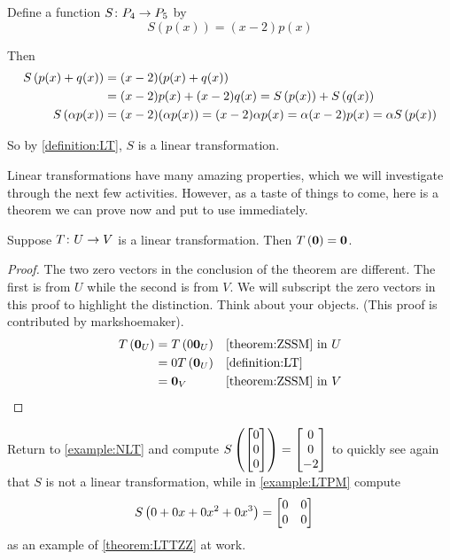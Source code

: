 \documentclass{ximera}
\begin{document}
\begin{example}

Define a function $S\colon P_4\rightarrow P_5$ by
\[
S(p(x))=(x-2)p(x)
\]


Then
\begin{align*}
S\left(p(x)+q(x)\right)&=(x-2)(p(x)+q(x))\\
&=(x-2)p(x)+(x-2)q(x)=S\left(p(x)\right)+S\left(q(x)\right)\\
S\left(\alpha p(x)\right)&=(x-2)(\alpha p(x))=(x-2)\alpha p(x)=\alpha(x-2)p(x)=\alpha S\left(p(x)\right)
\end{align*}



So by \ref{definition:LT}, $S$ is a linear transformation.


\end{example}

Linear transformations have many amazing properties, which we will
investigate through the next few activities.  However, as a taste of
things to come, here is a theorem we can prove now and put to use
immediately.


\begin{theorem}
\label{theorem:LTTZZ}

Suppose $T\colon U\rightarrow V$ is a linear transformation.  Then $T\left(\mathbf{0}\right)=\mathbf{0}$.

\begin{proof}
  The two zero vectors in the conclusion of the theorem are different.
  The first is from $U$ while the second is from $V$.  We will
  subscript the zero vectors in this proof to highlight the
  distinction.  Think about your objects.  (This proof is contributed
  by markshoemaker).
  \begin{align*}
    T\left(\mathbf{0}_U\right)
    &=T\left(0\mathbf{0}_U\right)
    &&\ref{theorem:ZSSM}\text{ in }U\\
    &=0T\left(\mathbf{0}_U\right)
    &&\ref{definition:LT}\\
    &=\mathbf{0}_V
    &&\ref{theorem:ZSSM}\text{ in }V
  \end{align*}
\end{proof}
\end{theorem}

Return to \ref{example:NLT} and compute $S\left(\begin{bmatrix}0\\0\\0\end{bmatrix}\right)=\begin{bmatrix}0\\0\\-2\end{bmatrix}$ to quickly see again that $S$ is not a linear transformation, while in \ref{example:LTPM}  compute
\begin{align*}
S\left(0+0x+0x^2+0x^3\right)&=\begin{bmatrix}0&0\\0&0\end{bmatrix}
\end{align*}
as an example of \ref{theorem:LTTZZ} at work.
\end{document}
